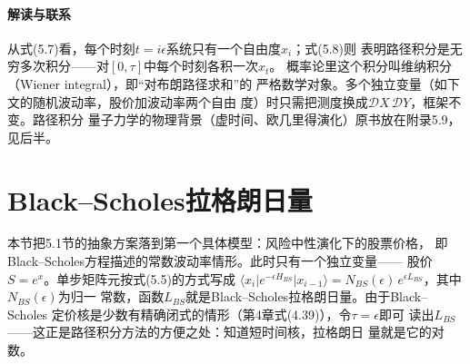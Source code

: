 \paragraph{解读与联系}
从式(5.7)看，每个时刻$t=i\epsilon$系统只有一个自由度$x_i$；式(5.8)则
表明路径积分是无穷多次积分——对$[0,\tau]$中每个时刻各积一次$x_t$。
概率论里这个积分叫维纳积分（Wiener integral），即“对布朗路径求和”的
严格数学对象。多个独立变量（如下文的随机波动率，股价加波动率两个自由
度）时只需把测度换成$\mathcal{D}X\,\mathcal{D}Y$，框架不变。路径积分
量子力学的物理背景（虚时间、欧几里得演化）原书放在附录5.9，见后半。

\section{Black--Scholes拉格朗日量}

本节把5.1节的抽象方案落到第一个具体模型：风险中性演化下的股票价格，
即Black--Scholes方程描述的常数波动率情形。此时只有一个独立变量——
股价$S=e^{x}$。单步矩阵元按式(5.5)的方式写成
$\langle x_{i}\vert e^{-\epsilon H_{BS}}\vert x_{i-1}\rangle
=N_{BS}(\epsilon)\,e^{\epsilon L_{BS}}$，其中$N_{BS}(\epsilon)$为归一
常数，函数$L_{BS}$就是Black--Scholes拉格朗日量。由于Black--Scholes
定价核是少数有精确闭式的情形（第4章式(4.39)），令$\tau=\epsilon$即可
读出$L_{BS}$——这正是路径积分方法的方便之处：知道短时间核，拉格朗日
量就是它的对数。

